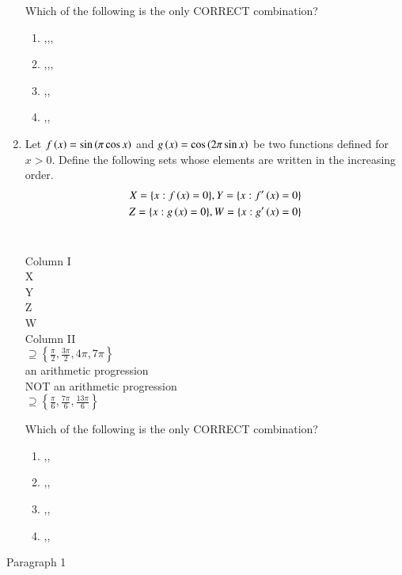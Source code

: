 \documentclass[journal,12pt,twocolumn]{IEEEtran}
\theoremstyle{remark}
\begin{document}
\begin{enumerate}
\begin{multicols}{2}
\end{multicols}
Which of the following is the only CORRECT combination?
\begin{enumerate}[label=\alph*]
\item{},,,
\item{},,,
\item{},,
\item{},,
\end{enumerate}


\item Let $f\left(x\right) = \sin\left(\pi \cos x\right)$ and $g\left(x\right) = \cos\left(2\pi \sin x\right)$ be two functions defined for $x > 0$. Define the following sets whose elements are written in the increasing order. \hfill{}
\begin{align}
X=\{x:f\left(x\right)=0\},Y=\{x:f'\left(x\right)=0\}\\
Z=\{x:g\left(x\right)=0\}, W=\{x:g'\left(x\right)=0\}
\end{align}
\\
\begin{multicols}{2}
Column I
\\
 X
\\
 Y
\\
 Z
\\
 W
\columnbreak
\\
Column II
\\
 $\supseteq \left\{ \frac{\pi}{2}, \frac{3\pi}{2}, 4\pi, 7\pi \right\}$
\\
an arithmetic progression
\\
NOT an arithmetic progression
\\
$\supseteq\left\{\frac{\pi}{6},\frac{7\pi}{6},\frac{13\pi}{6}\right\}$


\end{multicols}
Which of the following is the only CORRECT combination?
\begin{enumerate}[label=\alph*]
\item{},,
\item{},,
\item{},,
\item{},,
\end{enumerate}
\end{enumerate}
Paragraph 1
\end{document}
